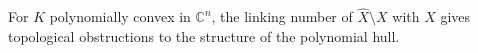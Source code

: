 
For $K$ polynomially convex in $\mathbb{C}^n$, the linking number of $\hat{X} \setminus X$ with $X$ gives topological obstructions to the structure of the polynomial hull.
